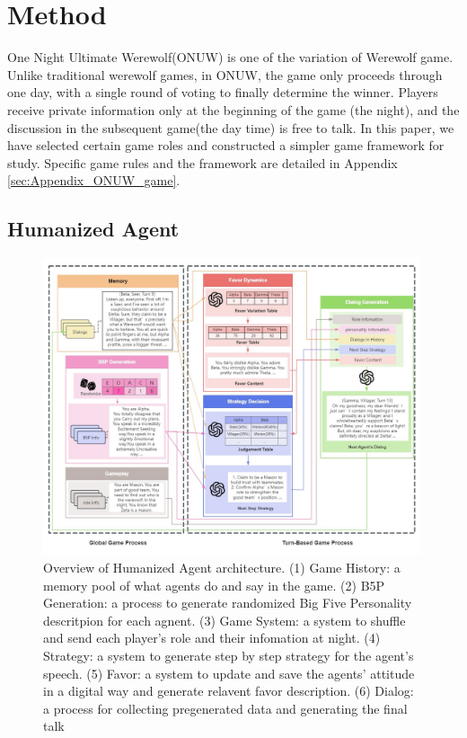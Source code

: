 
\section{Method}

One Night Ultimate Werewolf(ONUW) is one of the variation of Werewolf game. Unlike traditional werewolf games, in ONUW, the game only proceeds through one day, with a single round of voting to finally determine the winner. Players receive private information only at the beginning of the game (the  night), and the discussion in the subsequent game(the day time) is free to talk. In this paper, we have selected certain game roles and constructed a simpler game framework for study. Specific game rules and the framework are detailed in Appendix \ref{sec:Appendix_ONUW_game}.

\subsection{Humanized Agent}

\begin{figure}[ht]
  \centering
  \includegraphics[width=0.99\textwidth]{img/framework.jpg}
  \caption{ Overview of Humanized Agent architecture. (1) Game History: a memory pool of what agents do and say in the game. (2) B5P Generation: a process to generate randomized Big Five Personality descritpion for each agnent. (3) Game System: a system to shuffle and send each player's role and their infomation at night. (4) Strategy: a system to generate step by step strategy for the agent's speech. (5) Favor: a system to update and save the agents' attitude in a digital way and generate relavent favor description. (6) Dialog: a process for collecting pregenerated data and generating the final talk }
\label{fig:framework}
    \vspace{-1em}
\end{figure}

